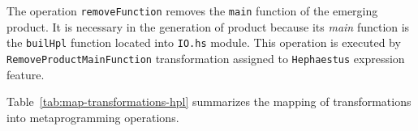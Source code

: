 The operation \texttt{removeFunction} removes the \texttt{main} function of the emerging product. It is necessary in the generation of \hp{} product because its \textit{main} function is the \texttt{builHpl} function located into \texttt{IO.hs} module. This operation is executed by \texttt{RemoveProductMainFunction} transformation assigned to \texttt{Hephaestus} expression feature.

Table~\ref{tab:map-transformations-hpl} summarizes the mapping of \hpl{} transformations into metaprogramming operations.

















